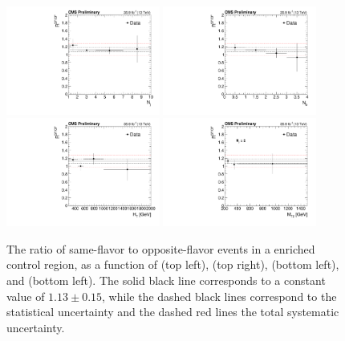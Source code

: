 \begin{figure}
	\centering
	\includegraphics[width=0.45\textwidth]{backgrounds/figs/RSFOF_nj}
	\includegraphics[width=0.45\textwidth]{backgrounds/figs/RSFOF_nb}
	\includegraphics[width=0.45\textwidth]{backgrounds/figs/RSFOF_ht}
	\includegraphics[width=0.45\textwidth]{backgrounds/figs/RSFOF_mt2}
	\renewcommand{\baselinestretch}{1.0}
	\caption[The ratio of same-flavor to opposite-flavor events in a \ttbar enriched control region, as a function of \nj (top left), \nb (top right), \HT (bottom left), and \mttwo (bottom left).]{The ratio of same-flavor to opposite-flavor events in a \ttbar enriched control region, as a function of \nj (top left), \nb (top right), \HT (bottom left), and \mttwo (bottom left). The solid black line corresponds to a constant value of $1.13 \pm 0.15$, while the dashed black lines correspond to the statistical uncertainty and the dashed red lines the total systematic uncertainty.}
	\label{fig:rsfof}
\end{figure}
